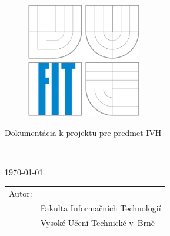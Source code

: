 \begin{titlepage}

\begin{figure}[!h]
  \centering
  \includegraphics[height=5cm]{img/logo.eps}
\end{figure}

\vfill

\begin{center}
\begin{Large}
Dokumentácia k projektu pre predmet IVH\\
\end{Large}
\bigskip
\begin{Huge}
\projname\\
\end{Huge}
\begin{large}
\end{large}
\end{center}

\vfill

\begin{center}
\begin{Large}
\today
\end{Large}
\end{center}

\vfill

\begin{flushleft}
\begin{large}
\begin{tabular}{ll}
Autor: & \author, \url{\email} \\
 & Fakulta Informačních Technologií \\
 & Vysoké Učení Technické v~Brně \\
\end{tabular}
\end{large}
\end{flushleft}
\end{titlepage}
